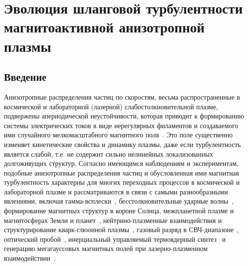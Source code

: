 \chapter{Эволюция шланговой турбулентности магнитоактивной анизотропной плазмы}
\label{ch:ch4}

\section{Введение}\label{ch:ch4/sec1}

Анизотропные распределения частиц по скоростям, весьма распространенные в космической и лабораторной (лазерной) слабостолкновительной плазме, подвержены апериодической неустойчивости, которая приводит к формированию системы электрических токов в виде нерегулярных филаментов и создаваемого ими случайного мелкомасштабного магнитного поля~\cite{Mikhailovsky1971,Krall1973}. Это поле существенно изменяет кинетические свойства и динамику плазмы, даже если турбулентность является слабой, т.е. не содержит сильно нелинейных локализованных долгоживущих структур. Согласно имеющимся наблюдениям и экспериментам, подобные анизотропные распределения частиц и обусловленная ими магнитная турбулентность характерны для многих переходных процессов в космической и лабораторной плазме и рассматриваются в связи с самыми разнообразными явлениями, включая гамма-всплески~\cite{Medvedev2006,Lazar2006,SchaeferRolffs2006}, бесстолкновительные ударные волны~\cite{Fiuza2012,Sakai2000,Nishikawa2009}, формирование магнитных структур в короне Солнца, межпланетной плазме и магнитосферах Земли и планет~\cite{Che2017,Zhou2022,Kuznetsov2025,Wu1984,Schlickeiser2011}, нейтрино-плазменные взаимодействия и структурирование кварк-глюонной плазмы~\cite{Silva1999,Mrwczyski1988,Arnold2005}, газовый разряд в СВЧ-диапазоне~\cite{Shokri2004,Ghorbanalilu2006}, оптический пробой~\cite{Ghorbanalilu2013,Zhang2019,Zhang2020,Huang2020}, инерциальный управляемый термоядерный синтез~\cite{Tabak1994} и генерацию мегагауссовых магнитных полей при лазерно-плазменном взаимодействии~\cite{Shukla2009,Wagner2004,Thaury2010,Schoeffler2016,Stepanov2022,Nechaev2020a,Nechaev2019_Radiophys}.

